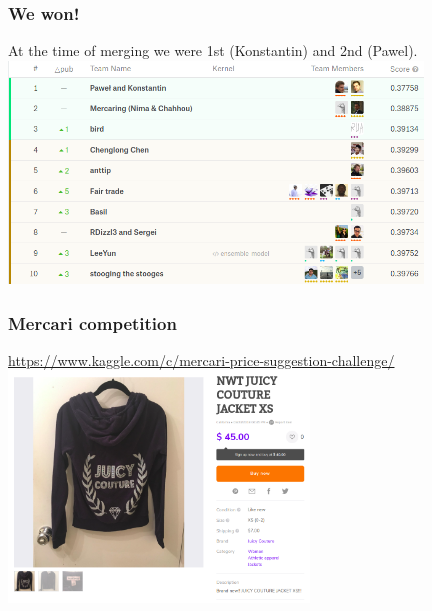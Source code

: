 \begin{frame}
\frametitle{We won!}

At the time of merging we were 1st (Konstantin) and 2nd (Pawel).
\includegraphics[width=11cm]{img/leaderboard.png}
\end{frame}
 
\begin{frame}
\frametitle{Mercari competition}
\href{https://www.kaggle.com/c/mercari-price-suggestion-challenge/}{https://www.kaggle.com/c/mercari-price-suggestion-challenge/}
\includegraphics[width=8cm]{img/mercari-item.png}
\end{frame}


